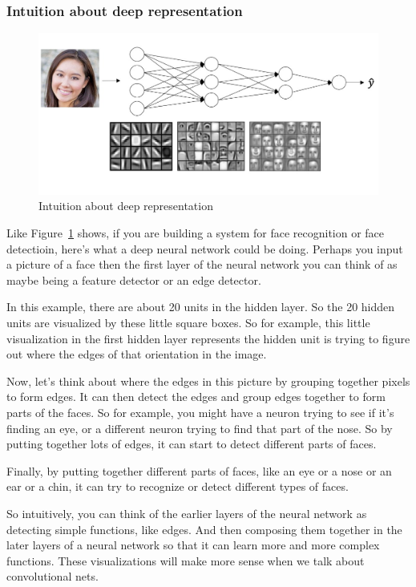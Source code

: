 \documentclass[UTF8]{article}
\begin{document}
\subsubsection{Intuition about deep representation}
\begin{figure}[htb]
    \centering
    \includegraphics[width=40em]{figures/dnn-intuition}
    \caption{Intuition about deep representation}
    \label{fig:dnn-intuition}
\end{figure}

Like Figure~\ref{fig:dnn-intuition} shows, if you are building a system for face recognition or
face detectioin, here's what a deep neural network could be doing. Perhaps you input a picture of
a face then the first layer of the neural network you can think of as maybe being a feature
detector or an edge detector.

In this example, there are about 20 units in the hidden layer. So the 20 hidden units are
visualized by these little square boxes. So for example, this little visualization in the first
hidden layer represents the hidden unit is trying to figure out where the edges of that orientation
in the image.

Now, let's think about where the edges in this picture by grouping together pixels to form edges.
It can then detect the edges and group edges together to form parts of the faces. So for example,
you might have a neuron trying to see if it's finding an eye, or a different neuron trying to find
that part of the nose. So by putting together lots of edges, it can start to detect different parts
of faces.

Finally, by putting together different parts of faces, like an eye or a nose or an ear or a chin,
it can try to recognize or detect different types of faces.

So intuitively, you can think of the earlier layers of the neural network as detecting simple
functions, like edges. And then composing them together in the later layers of a neural network so
that it can learn more and more complex functions. These visualizations will make more sense when
we talk about convolutional nets.
\end{document}
